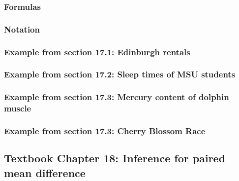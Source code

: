 \documentclass[
]{report}
\begin{document}
\hypertarget{formulas-3}{%
\subsubsection*{Formulas}\label{formulas-3}}

\hypertarget{notation-2}{%
\subsubsection*{Notation}\label{notation-2}}

\hypertarget{example-from-section-17.1-edinburgh-rentals}{%
\subsubsection*{Example from section 17.1: Edinburgh rentals}\label{example-from-section-17.1-edinburgh-rentals}}

\hypertarget{example-from-section-17.2-sleep-times-of-msu-students}{%
\subsubsection*{Example from section 17.2: Sleep times of MSU students}\label{example-from-section-17.2-sleep-times-of-msu-students}}

\hypertarget{example-from-section-17.3-mercury-content-of-dolphin-muscle}{%
\subsubsection*{Example from section 17.3: Mercury content of dolphin muscle}\label{example-from-section-17.3-mercury-content-of-dolphin-muscle}}

\hypertarget{example-from-section-17.3-cherry-blossom-race}{%
\subsubsection*{Example from section 17.3: Cherry Blossom Race}\label{example-from-section-17.3-cherry-blossom-race}}

\hypertarget{textbook-chapter-18-inference-for-paired-mean-difference}{%
\subsection*{Textbook Chapter 18: Inference for paired mean difference}\label{textbook-chapter-18-inference-for-paired-mean-difference}}
\end{document}
